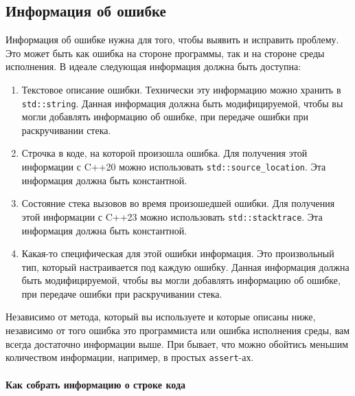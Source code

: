 \subsection{Информация об ошибке}
\label{section::ErrorMsg}

Информация об ошибке нужна для того, чтобы выявить и исправить проблему.
Это может быть как ошибка на стороне программы, так и на стороне среды исполнения.
В идеале следующая информация должна быть доступна:
\begin{enumerate}
\item Текстовое описание ошибки.
Технически эту информацию можно хранить в \verb"std::string".
Данная информация должна быть модифицируемой, чтобы вы могли добавлять информацию об ошибке, при передаче ошибки при раскручивании стека.

\item Строчка в коде, на которой произошла ошибка.
Для получения этой информации с C++20 можно использовать \verb"std::source_location".
Эта информация должна быть константной.

\item Состояние стека вызовов во время произошедшей ошибки.
Для получения этой информации с C++23 можно использовать \verb"std::stacktrace".
Эта информация должна быть константной.

\item Какая-то специфическая для этой ошибки информация.
Это произвольный тип, который настраивается под каждую ошибку.
Данная информация должна быть модифицируемой, чтобы вы могли добавлять информацию об ошибке, при передаче ошибки при раскручивании стека.
\end{enumerate}
Независимо от метода, который вы используете и которые описаны ниже, независимо от того ошибка это программиста или ошибка исполнения среды, вам всегда достаточно информации выше.
При бывает, что можно обойтись меньшим количеством информации,  например, в простых \verb"assert"-ах.

\paragraph{Как собрать информацию о строке кода}

